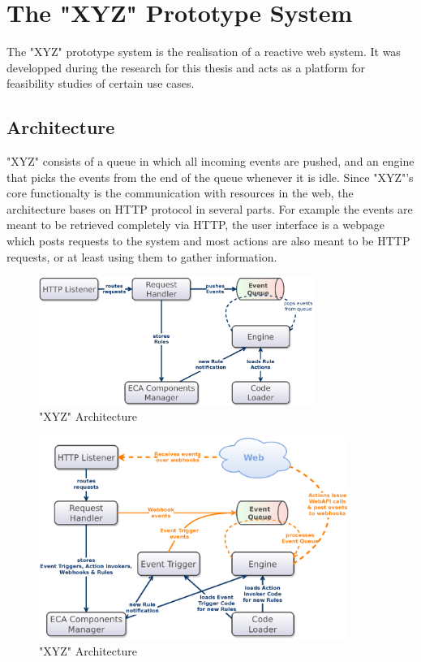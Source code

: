 
\chapter{The "XYZ" Prototype System}
%

The "XYZ" prototype system is the realisation of a reactive web system.
It was developped during the research for this thesis and acts as a platform for feasibility studies of certain use cases.




\section{Architecture}
"XYZ" consists of a queue in which all incoming events are pushed, and an engine that picks the events from the end of the queue whenever it is idle.
Since "XYZ"'s core functionalty is the communication with resources in the web, the architecture bases on HTTP protocol in several parts.
For example the events are meant to be retrieved completely via HTTP, the user interface is a webpage which posts requests to the system and most actions are also meant to be HTTP requests, or at least using them to gather information.

\begin{figure}[h!]
	\centering
  \includegraphics[width=0.8\textwidth]{figures/Architecture_woET}
	\caption{"XYZ" Architecture}
	\label{fig:Architecture_woEP}
\end{figure}

\begin{figure}[h!]
	\centering
  \includegraphics[width=0.9\textwidth]{figures/Architecture_wET}
	\caption{"XYZ" Architecture}
	\label{fig:Architecture_wET}
\end{figure}


